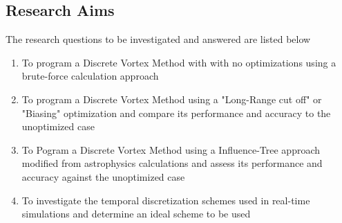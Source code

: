\subsection{Research Aims}
The research questions to be investigated and answered are listed below

\begin{enumerate}
\item To program a Discrete Vortex Method with with no optimizations using a brute-force calculation approach
\item To program a Discrete Vortex Method using a "Long-Range cut off" or "Biasing" optimization and compare its performance and accuracy to the unoptimized case
\item To Pogram a Discrete Vortex Method using a Influence-Tree approach modified from astrophysics calculations and assess its performance and accuracy against the unoptimized case
\item To investigate the temporal discretization schemes used in real-time simulations and determine an ideal scheme to be used
\end{enumerate}

